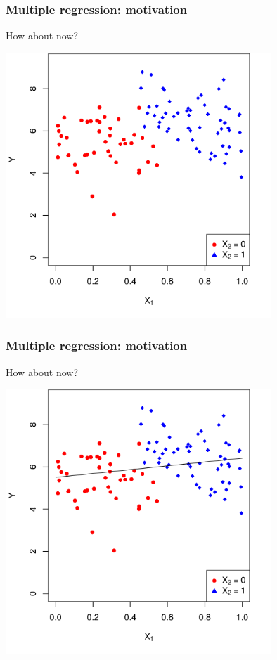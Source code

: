 \documentclass[12pt, 
hyperref={colorlinks=true, linkcolor=blue, urlcolor=cyan}]{beamer}
\begin{document}
\begin{frame}
\frametitle{Multiple regression: motivation}
How about now?

\vspace{-0.3cm}
\centering
\includegraphics[width = 0.75\textwidth]{./plots/confounding_colored.png}
\end{frame}

\begin{frame}
\frametitle{Multiple regression: motivation}
How about now?

\vspace{-0.3cm}
\centering
\includegraphics[width = 0.75\textwidth]{./plots/confounding_colored_with_simple_line.png}
\end{frame}
\end{document}
